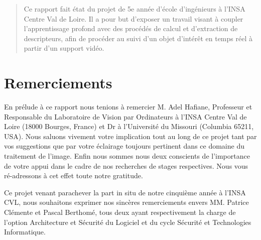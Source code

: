 \begin{abstract}
	Ce rapport fait état du projet de 5e année d’école d’ingénieurs à l’INSA Centre Val de Loire. 
	Il a pour but d’exposer un travail visant à coupler l’apprentissage profond avec des procédés de calcul et d’extraction de descripteurs, afin de procéder au suivi d’un objet d’intérêt en temps réel à partir d’un support vidéo.  
\end{abstract}

\section*{Remerciements}
	En prélude à ce rapport nous tenions à remercier M. Adel Hafiane, Professeur et Responsable du Laboratoire de Vision par Ordinateurs à l’INSA Centre Val de Loire (18000 Bourges, France) et Dr à l’Université du Missouri (Columbia 65211, USA). Nous saluons vivement votre implication tout au long de ce projet tant par vos suggestions que par votre éclairage toujours pertinent dans ce domaine du traitement de l’image. Enfin nous sommes nous deux conscients de l’importance de votre appui dans le cadre de nos recherches de stages respectives. Nous vous ré-adressons à cet effet toute notre gratitude.
	
	Ce projet venant parachever la part in situ de notre cinquième année à l’INSA CVL, nous souhaitons exprimer nos sincères remerciements envers MM. Patrice Clémente et Pascal Berthomé, tous deux ayant respectivement la charge de l’option Architecture et Sécurité du Logiciel et du cycle Sécurité et Technologies Informatique. 